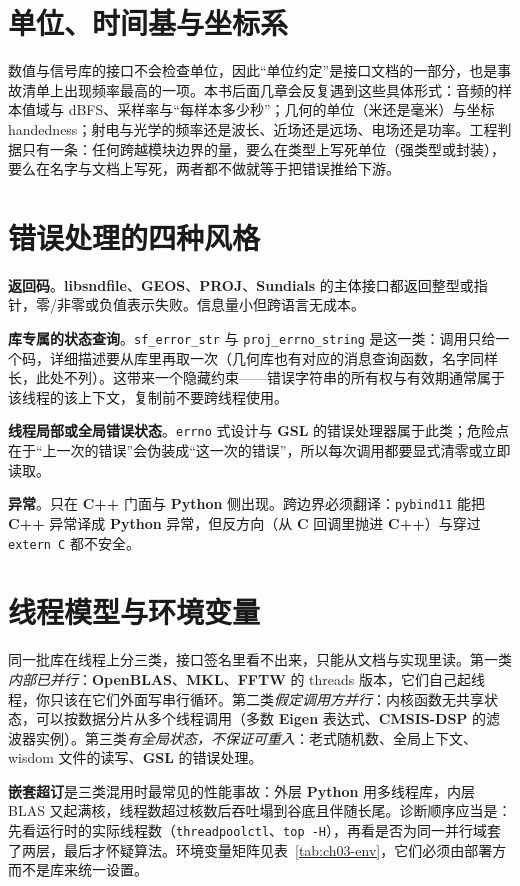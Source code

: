\documentclass[12pt,a4paper,fontset=fandol]{ctexbook}
\newcommand{\Tp}[1]{\texttt{#1}}
\newcommand{\Lib}[1]{\textbf{#1}}
\newcommand{\Lang}[1]{\textsf{\bfseries #1}}
\newcommand{\CL}{\Lang{C}}
\newcommand{\CPP}{\Lang{C++}}
\newcommand{\PY}{\Lang{Python}}
\begin{document}
\section{单位、时间基与坐标系}

数值与信号库的接口不会检查单位，因此``单位约定''是接口文档的一部分，也是事故清单上出现频率最高的一项。本书后面几章会反复遇到这些具体形式：音频的样本值域与 dBFS、采样率与``每样本多少秒''；几何的单位（米还是毫米）与坐标 handedness；射电与光学的频率还是波长、近场还是远场、电场还是功率。工程判据只有一条：任何跨越模块边界的量，要么在类型上写死单位（强类型或封装），要么在名字与文档上写死，两者都不做就等于把错误推给下游。

\section{错误处理的四种风格}

\textbf{返回码}。\Lib{libsndfile}、\Lib{GEOS}、\Lib{PROJ}、\Lib{Sundials} 的主体接口都返回整型或指针，零/非零或负值表示失败。信息量小但跨语言无成本。

\textbf{库专属的状态查询}。\Tp{sf\_error\_str} 与 \Tp{proj\_errno\_string} 是这一类：调用只给一个码，详细描述要从库里再取一次（几何库也有对应的消息查询函数，名字同样长，此处不列）。这带来一个隐藏约束——错误字符串的所有权与有效期通常属于该线程的该上下文，复制前不要跨线程使用。

\textbf{线程局部或全局错误状态}。\Tp{errno} 式设计与 \Lib{GSL} 的错误处理器属于此类；危险点在于``上一次的错误''会伪装成``这一次的错误''，所以每次调用都要显式清零或立即读取。

\textbf{异常}。只在 \CPP{} 门面与 \PY{} 侧出现。跨边界必须翻译：\Tp{pybind11} 能把 \CPP{} 异常译成 \PY{} 异常，但反方向（从 \CL{} 回调里抛进 \CPP{}）与穿过 \Tp{extern \textquotedbl C\textquotedbl} 都不安全。

\section{线程模型与环境变量}

同一批库在线程上分三类，接口签名里看不出来，只能从文档与实现里读。第一类\emph{内部已并行}：\Lib{OpenBLAS}、\Lib{MKL}、\Lib{FFTW} 的 threads 版本，它们自己起线程，你只该在它们外面写串行循环。第二类\emph{假定调用方并行}：内核函数无共享状态，可以按数据分片从多个线程调用（多数 \Lib{Eigen} 表达式、\Lib{CMSIS-DSP} 的滤波器实例）。第三类\emph{有全局状态，不保证可重入}：老式随机数、全局上下文、wisdom 文件的读写、\Lib{GSL} 的错误处理。

\textbf{嵌套超订}是三类混用时最常见的性能事故：外层 \PY{} 用多线程库，内层 BLAS 又起满核，线程数超过核数后吞吐塌到谷底且伴随长尾。诊断顺序应当是：先看运行时的实际线程数（\Tp{threadpoolctl}、\Tp{top -H}），再看是否为同一并行域套了两层，最后才怀疑算法。环境变量矩阵见表~\ref{tab:ch03-env}，它们必须由部署方而不是库来统一设置。
\end{document}
